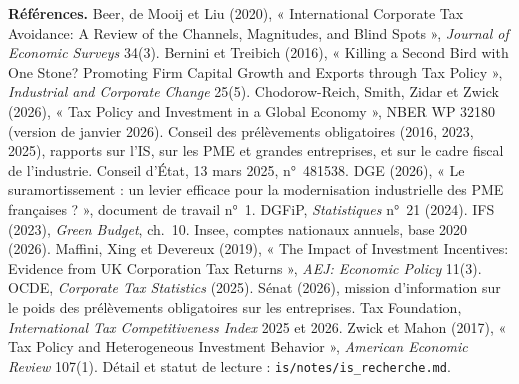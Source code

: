 \documentclass[11pt,a4paper]{article}
\begin{document}
\vspace{6pt}
{\scriptsize\textbf{Références.} Beer, de Mooij et Liu (2020), « International Corporate Tax Avoidance: A
Review of the Channels, Magnitudes, and Blind Spots », \emph{Journal of Economic Surveys} 34(3). Bernini et
Treibich (2016), « Killing a Second Bird with One Stone? Promoting Firm Capital Growth and Exports
through Tax Policy », \emph{Industrial and Corporate Change} 25(5). Chodorow-Reich, Smith, Zidar et Zwick (2026), « Tax
Policy and Investment in a Global Economy », NBER WP 32180 (version de janvier 2026). Conseil des
prélèvements obligatoires (2016, 2023, 2025), rapports sur l'IS, sur les PME et grandes entreprises, et sur
le cadre fiscal de l'industrie. Conseil d'État, 13 mars 2025, n°~481538. DGE (2026), « Le suramortissement :
un levier efficace pour la modernisation industrielle des PME françaises ? », document de travail n°~1.
DGFiP, \emph{Statistiques} n°~21 (2024). IFS (2023), \emph{Green Budget}, ch.~10. Insee, comptes nationaux
annuels, base 2020 (2026). Maffini, Xing et Devereux (2019), « The Impact of Investment Incentives: Evidence
from UK Corporation Tax Returns », \emph{AEJ: Economic Policy} 11(3). OCDE, \emph{Corporate Tax Statistics}
(2025). Sénat (2026), mission d'information sur le poids des prélèvements obligatoires sur les entreprises.
Tax Foundation, \emph{International Tax Competitiveness Index} 2025 et 2026. Zwick et Mahon (2017), « Tax
Policy and Heterogeneous Investment Behavior », \emph{American Economic Review} 107(1). Détail et statut de
lecture : \texttt{is/notes/is\_recherche.md}.\par}
\end{document}

